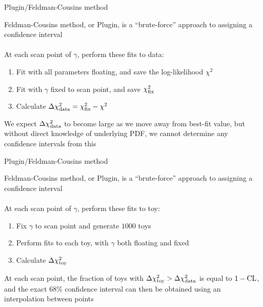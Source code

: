 \documentclass{beamer}
\begin{document}
\begin{frame}{Plugin/Feldman-Cousins method}
  \begin{center}
    {\Large Feldman-Cousins method, or Plugin, is a ``brute-force'' approach to assigning a confidence interval} \\~\\
    {At each scan point of $\gamma$, perform these fits to data:}
  \end{center}
  \begin{enumerate}
    \setlength\itemsep{0.5em}
    \item{Fit with all parameters floating, and save the log-likelihood $\chi^2$}
    \item{Fit with $\gamma$ fixed to scan point, and save $\chi^2_{\rm fix}$}
    \item{Calculate $\Delta\chi^2_{\rm data} = \chi^2_{\rm fix} - \chi^2$}
  \end{enumerate}
  \vspace{0.5cm}
  \begin{center}
    {We expect $\Delta\chi^2_{\rm data}$ to become large as we move away from best-fit value, but without direct knowledge of underlying PDF, we cannot determine any confidence intervals from this}
  \end{center}
\end{frame}

\begin{frame}{Plugin/Feldman-Cousins method}
  \begin{center}
    {\Large Feldman-Cousins method, or Plugin, is a ``brute-force'' approach to assigning a confidence interval} \\~\\
    {At each scan point of $\gamma$, perform these fits to toy:}
  \end{center}
  \begin{enumerate}
    \setlength\itemsep{0.5em}
    \item{Fix $\gamma$ to scan point and generate $1000$ toys}
    \item{Perform fits to each toy, with $\gamma$ both floating and fixed}
    \item{Calculate $\Delta\chi^2_{\rm toy}$}
  \end{enumerate}
  \vspace{0.42cm}
  \begin{center}
    {At each scan point, the fraction of toys with $\Delta\chi^2_{\rm toy} > \Delta\chi^2_{\rm data}$ is equal to $1 - \rm{CL}$, and the exact $68\%$ confidence interval can then be obtained using an interpolation between points}
  \end{center}
\end{frame}
\end{document}
